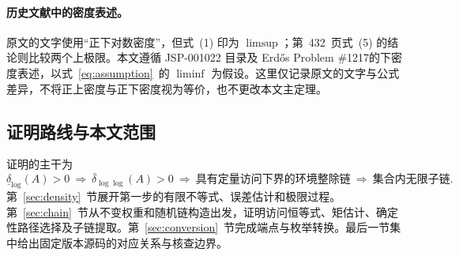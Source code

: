 \paragraph{历史文献中的密度表述。}
原文\cite[p.~431]{erdos1966}的文字使用“正下对数密度”，但式~(1) 印为 $\limsup$；第~432~页式~(5) 的结论则比较两个上极限。本文遵循 JSP-001022 目录\cite{jspcatalog}及 Erd\H{o}s Problem \#1217\cite{erdos1217}的下密度表述，以式~\eqref{eq:assumption}~的 $\liminf$ 为假设。这里仅记录原文的文字与公式差异，不将正上密度与正下密度视为等价，也不更改本文主定理。

\subsection{证明路线与本文范围}
证明的主干为
\[
 \underline\delta_{\log}(A)>0
 \ \Longrightarrow\ \overline\delta_{\log\log}(A)>0
 \ \Longrightarrow\ \text{具有定量访问下界的环境整除链}
 \ \Longrightarrow\ \text{集合内无限子链}.
\]
第~\ref{sec:density}~节展开第一步的有限不等式、误差估计和极限过程。第~\ref{sec:chain}~节从不变权重和随机链构造出发，证明访问恒等式、矩估计、确定性路径选择及子链提取。第~\ref{sec:conversion}~节完成端点与枚举转换。最后一节集中给出固定版本源码的对应关系与核查边界。
